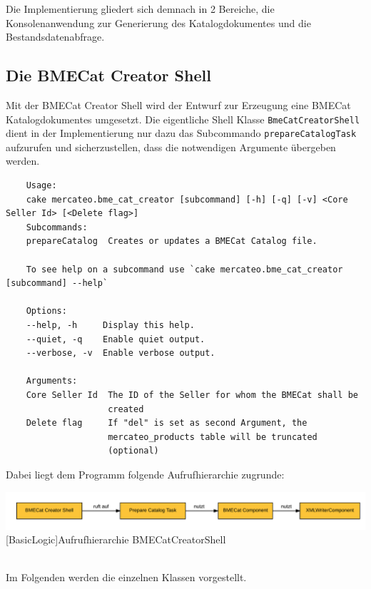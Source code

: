 	Die Implementierung gliedert sich demnach in 2 Bereiche, die Konsolenanwendung zur Generierung des Katalogdokumentes und die Bestandsdatenabfrage.
	
	\subsection{Die BMECat Creator Shell}
	
	Mit der BMECat Creator Shell wird der Entwurf zur Erzeugung eine BMECat Katalogdokumentes umgesetzt. Die eigentliche Shell Klasse \texttt{BmeCatCreatorShell} dient in der Implementierung nur dazu das Subcommando \texttt{prepareCatalogTask} aufzurufen und sicherzustellen, dass die notwendigen Argumente übergeben werden.
	\lstset{basicstyle=\scriptsize\ttfamily}
	\begin{lstlisting}
	Usage:
	cake mercateo.bme_cat_creator [subcommand] [-h] [-q] [-v] <Core Seller Id> [<Delete flag>]
	Subcommands:
	prepareCatalog  Creates or updates a BMECat Catalog file.
	
	To see help on a subcommand use `cake mercateo.bme_cat_creator [subcommand] --help`
	
	Options:	
	--help, -h     Display this help.
	--quiet, -q    Enable quiet output.
	--verbose, -v  Enable verbose output.
	
	Arguments:	
	Core Seller Id  The ID of the Seller for whom the BMECat shall be
	                created
	Delete flag     If "del" is set as second Argument, the
	                mercateo_products table will be truncated
	                (optional)
	\end{lstlisting}
	
	Dabei liegt dem Programm folgende Aufrufhierarchie zugrunde:\\
	\begin{minipage}{\linewidth}
		\vspace{1em}
		\centering
		\includegraphics[width=1 \linewidth]{img/shellFlow}
		[BasicLogic]{Aufrufhierarchie BMECatCreatorShell}
		\vspace{1em}
	\end{minipage}\\
	
	
	
	
	Im Folgenden werden die einzelnen Klassen vorgestellt.
	
